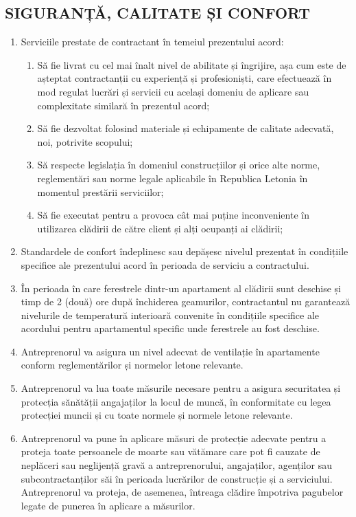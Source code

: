 \begin{multicols}{2}
\subsection{SIGURANȚĂ, CALITATE ȘI CONFORT}
\begin{enumerate}
\item Serviciile prestate de contractant în temeiul prezentului acord:
  \begin{enumerate}
\item Să fie livrat cu cel mai înalt nivel de abilitate și îngrijire, așa cum este de așteptat contractanții cu experiență și profesioniști, care efectuează în mod regulat lucrări și servicii cu același domeniu de aplicare sau complexitate similară în prezentul acord;
\item Să fie dezvoltat folosind materiale și echipamente de calitate adecvată, noi, potrivite scopului;
\item Să respecte legislația în domeniul construcțiilor și orice alte norme, reglementări sau norme legale aplicabile în Republica Letonia în momentul prestării serviciilor;
\item Să fie executat pentru a provoca cât mai puține inconveniente în utilizarea clădirii de către client și alți ocupanți ai clădirii;
\end{enumerate}
\item Standardele de confort îndeplinesc sau depășesc nivelul prezentat în condițiile specifice ale prezentului acord în perioada de serviciu a contractului.
\item În perioada în care ferestrele dintr-un apartament al clădirii sunt deschise și timp de 2 (două) ore după închiderea geamurilor, contractantul nu garantează nivelurile de temperatură interioară convenite în condițiile specifice ale acordului pentru apartamentul specific unde ferestrele au fost deschise.
\item Antreprenorul va asigura un nivel adecvat de ventilație în apartamente conform reglementărilor și normelor letone relevante.
\item Antreprenorul va lua toate măsurile necesare pentru a asigura securitatea și protecția sănătății angajaților la locul de muncă, în conformitate cu legea protecției muncii și cu toate normele și normele letone relevante.
\item Antreprenorul va pune în aplicare măsuri de protecție adecvate pentru a proteja toate persoanele de moarte sau vătămare care pot fi cauzate de neplăceri sau neglijență gravă a antreprenorului, angajaților, agenților sau subcontractanților săi în perioada lucrărilor de construcție și a serviciului. Antreprenorul va proteja, de asemenea, întreaga clădire împotriva pagubelor legate de punerea în aplicare a măsurilor.

\end{enumerate}
\end{multicols}
